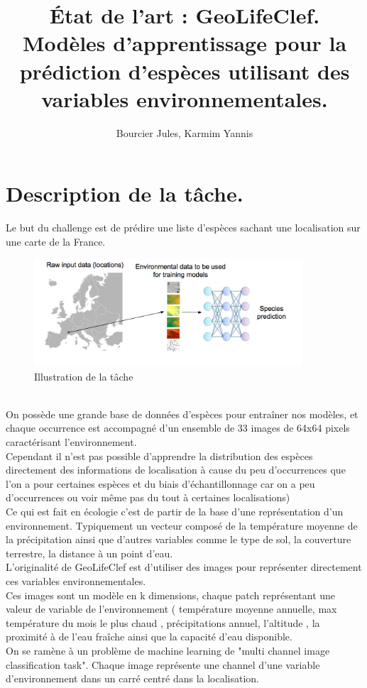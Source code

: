 \documentclass{article}
\begin{document}
\title{État de l'art : GeoLifeClef.\\Modèles d'apprentissage pour la prédiction d'espèces utilisant des variables environnementales. }
\author{Bourcier Jules, Karmim Yannis}
\maketitle


\clearpage
\section{Description de la tâche. }
Le but du challenge est de prédire une liste d'espèces sachant une localisation sur une carte de la France.
\\
\begin{figure}[h]
	\center
	\includegraphics[width=10cm]{figure/figure1.png} 
	 \caption{Illustration de la tâche }
\end{figure}
\\
On possède une grande base de données d'espèces pour entraîner nos modèles, et chaque occurrence est accompagné d’un ensemble de 33 images de 64x64 pixels caractérisant l’environnement.
\\
Cependant il n'est pas possible d'apprendre la distribution des espèces directement des informations de localisation à cause du peu d'occurrences que l'on a pour certaines espèces et du biais d'échantillonnage car on a peu d’occurrences ou voir même pas du tout à certaines localisations)
\\
Ce qui est fait en écologie c'est de partir de la base d'une représentation d'un environnement. Typiquement un vecteur composé de la température moyenne de la  précipitation ainsi que d'autres variables comme le type de sol, la couverture terrestre, la distance à un point d'eau.\\
L'originalité de GeoLifeClef est d'utiliser des images pour représenter directement ces variables environnementales.
\\
Ces images sont un modèle en k dimensions, chaque patch représentant une valeur de variable de l'environnement ( température moyenne annuelle, max température du mois le plus chaud , précipitations annuel, l'altitude , la proximité à de l'eau fraîche ainsi que la capacité d'eau disponible.
\\
On se ramène à un problème de machine learning de "multi channel image classification task".
Chaque image représente une channel d'une variable d'environnement dans un carré centré dans la localisation.
\end{document}
